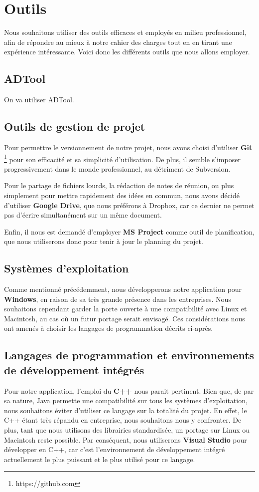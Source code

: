 \section{Outils}
    \label{sec:outils}
    	Nous souhaitons utiliser des outils efficaces et employés en milieu professionnel, afin de répondre au mieux à notre cahier des charges tout en en tirant une expérience intéressante. Voici donc les différents outils que nous allons employer.
    	
    \subsection{ADTool}
    On va utiliser ADTool.
         
    \subsection{Outils de gestion de projet}
        Pour permettre le versionnement de notre projet, nous avons choisi d'utiliser {\bf Git} \footnote{https://github.com} pour son efficacité et sa simplicité d'utilisation. De plus, il semble s'imposer progressivement dans le monde professionnel, au détriment de Subversion.
        
        Pour le partage de fichiers lourds, la rédaction de notes de réunion, ou plus simplement pour mettre rapidement des idées en commun, nous avons décidé d'utiliser {\bf Google Drive}, que nous préférons à Dropbox, car ce dernier ne permet pas d'écrire simultanément sur un même document.

        Enfin, il nous est demandé d'employer {\bf MS Project} comme outil de planification, que nous utiliserons donc pour tenir à jour le planning du projet.

	\subsection{Systèmes d'exploitation}
	   Comme mentionné précédemment, nous développerons notre application pour {\bf Windows}, en raison de sa très grande présence dans les entreprises. Nous souhaitons cependant garder la porte ouverte à une compatibilité avec Linux et Macintosh, au cas où un futur portage serait envisagé. Ces considérations nous ont amenés à choisir les langages de programmation décrits ci-après.
	
    \subsection{Langages de programmation et environnements de développement intégrés}
        Pour notre application, l'emploi du {\bf C++} nous parait pertinent. Bien que, de par sa nature, Java permette une compatibilité sur tous les systèmes d'exploitation, nous souhaitons éviter d'utiliser ce langage sur la totalité du projet. En effet, le C++ étant très répandu en entreprise, nous souhaitons nous y confronter. De plus, tant que nous utilisons des librairies standardisée, un portage sur Linux ou Macintosh reste possible. Par conséquent, nous utiliserons {\bf Visual Studio} pour développer en C++, car c'est l'environnement de développement intégré actuellement le plus puissant et le plus utilisé  pour ce langage.
        
